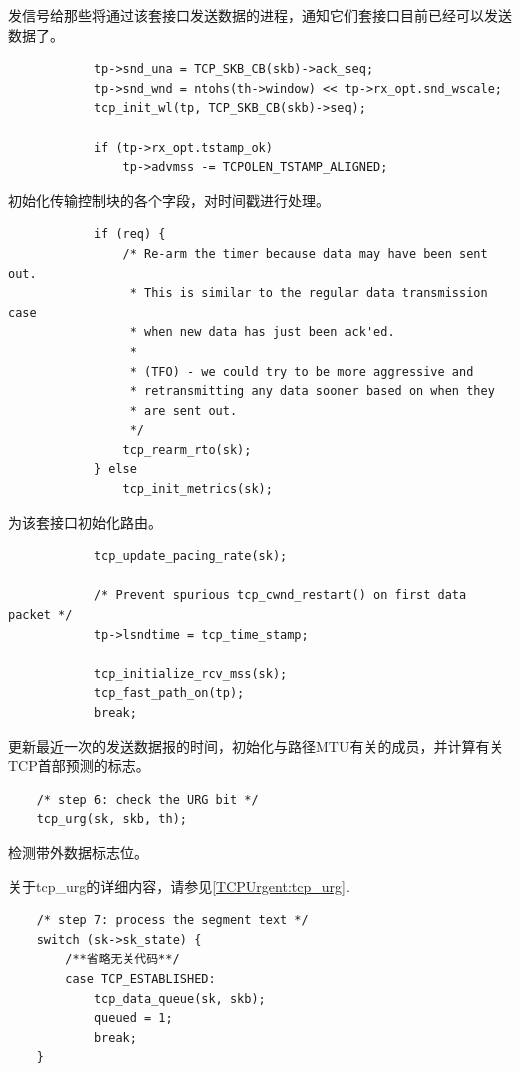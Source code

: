     发信号给那些将通过该套接口发送数据的进程，通知它们套接口目前已经可以发送数据了。

\begin{verbatim}
            tp->snd_una = TCP_SKB_CB(skb)->ack_seq;
            tp->snd_wnd = ntohs(th->window) << tp->rx_opt.snd_wscale;
            tcp_init_wl(tp, TCP_SKB_CB(skb)->seq);

            if (tp->rx_opt.tstamp_ok)
                tp->advmss -= TCPOLEN_TSTAMP_ALIGNED;
\end{verbatim}

    初始化传输控制块的各个字段，对时间戳进行处理。

\begin{verbatim}
            if (req) {
                /* Re-arm the timer because data may have been sent out.
                 * This is similar to the regular data transmission case
                 * when new data has just been ack'ed.
                 *
                 * (TFO) - we could try to be more aggressive and
                 * retransmitting any data sooner based on when they
                 * are sent out.
                 */
                tcp_rearm_rto(sk);
            } else
                tcp_init_metrics(sk);
\end{verbatim}

    为该套接口初始化路由。

\begin{verbatim}
            tcp_update_pacing_rate(sk);

            /* Prevent spurious tcp_cwnd_restart() on first data packet */
            tp->lsndtime = tcp_time_stamp;

            tcp_initialize_rcv_mss(sk);
            tcp_fast_path_on(tp);
            break;
\end{verbatim}

    更新最近一次的发送数据报的时间，初始化与路径MTU有关的成员，并计算有关TCP首部预测的标志。

\begin{verbatim}
    /* step 6: check the URG bit */
    tcp_urg(sk, skb, th);
\end{verbatim}

    检测带外数据标志位。

	关于tcp\_urg的详细内容，请参见\ref{TCPUrgent:tcp_urg}.

\begin{verbatim}
    /* step 7: process the segment text */
    switch (sk->sk_state) {
        /**省略无关代码**/
        case TCP_ESTABLISHED:
            tcp_data_queue(sk, skb);
            queued = 1;
            break;
    }
\end{verbatim}

